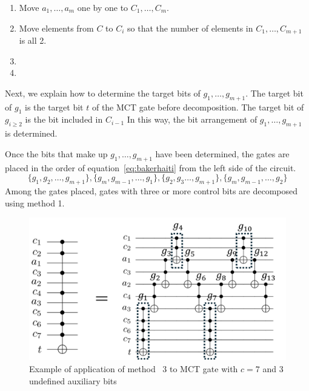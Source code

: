 \begin{enumerate}[Step 1]

\item Move $a_{1},\dots,a_{m}$ one by one to $C_{1},\dots ,C_{m}$.

\item Move elements from $C$ to $C_{i}$ so that the number of elements in $C_{1},\dots,C_{m+1}$ is all 2. 
\item {}
\item {}
\end{enumerate}
\par
Next, we explain how to determine the target bits of $g_{1},\dots ,g_{m+1}$.
The target bit of $g_{1}$ is the target bit $t$ of the MCT gate before decomposition.
The target bit of $g_{i\geq 2}$ is the bit included in $C_{i-1}$
In this way, the bit arrangement of $g_{1},\dots, g_{m+1}$ is determined.
\par
Once the bits that make up $g_{1},\dots,g_{m+1}$ have been determined,
the gates are placed in the order of equation~\ref{eq:bakerhaiti} from the left side of the circuit.
\begin{equation}\label{eq:bakerhaiti}
\{g_{1}, g_{2}, \dots, g_{m+1}\},\{g_{m},g_{m-1}, \dots, g_{1}\}, \{g_{2}, g_{3} \dots, g_{m+1}\}, \{g_{m}, g_{m-1}, \dots, g_{2}\}
\end{equation}
Among the gates placed, gates with three or more control bits are decomposed using method 1.
\begin{figure}[tbp]
\centering
\includegraphics[width=0.95\linewidth]{img/baker.pdf}
\caption{Example of application of method ~3 to MCT gate with $c=7$ and 3 undefined auxiliary bits}
\label{baker}
\end{figure}
